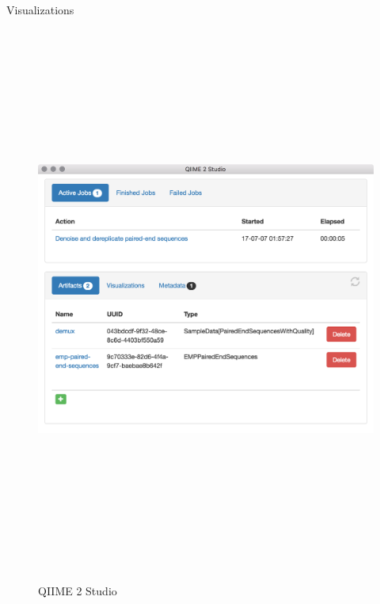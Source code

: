 \documentclass[final]{beamer}
\newlength{\colwidth}
\begin{document}
\begin{frame}[t]
\begin{columns}[t]
\begin{column}{\colwidth}
\begin{block}{Visualizations}
    \begin{figure}[tph!]
      {\includegraphics[height=18cm]{assets/q2studio}}
      \caption{QIIME 2 Studio}
      \label{fig:q2studio}
    \end{figure}


\end{block}
\end{column}
\end{columns}
\end{frame}
\end{document}
